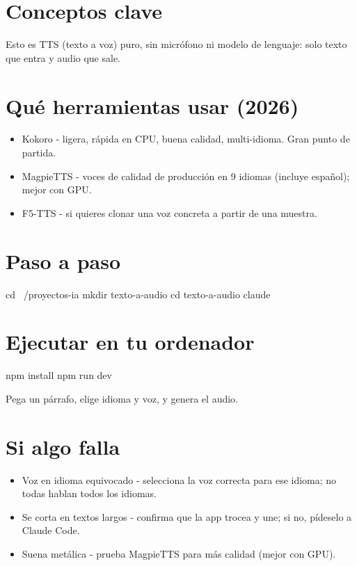 \documentclass[11pt,a4paper]{book}
\begin{document}
\section{Conceptos clave}
Esto es TTS (texto a voz) puro, sin micrófono ni modelo de lenguaje: solo texto que entra y audio que sale.

\section{Qué herramientas usar (2026)}
\begin{itemize}\item Kokoro - ligera, rápida en CPU, buena calidad, multi-idioma. Gran punto de partida.\end{itemize}
\begin{itemize}\item MagpieTTS - voces de calidad de producción en 9 idiomas (incluye español); mejor con GPU.\end{itemize}
\begin{itemize}\item F5-TTS - si quieres clonar una voz concreta a partir de una muestra.\end{itemize}
\section{Paso a paso}
\begin{codebox}
cd ~/proyectos-ia
mkdir texto-a-audio
cd texto-a-audio
claude
\end{codebox}
\section{Ejecutar en tu ordenador}
\begin{codebox}
npm install
npm run dev
\end{codebox}
Pega un párrafo, elige idioma y voz, y genera el audio.

\section{Si algo falla}
\begin{itemize}\item Voz en idioma equivocado - selecciona la voz correcta para ese idioma; no todas hablan todos los idiomas.\end{itemize}
\begin{itemize}\item Se corta en textos largos - confirma que la app trocea y une; si no, pídeselo a Claude Code.\end{itemize}
\begin{itemize}\item Suena metálica - prueba MagpieTTS para más calidad (mejor con GPU).\end{itemize}
\end{document}
